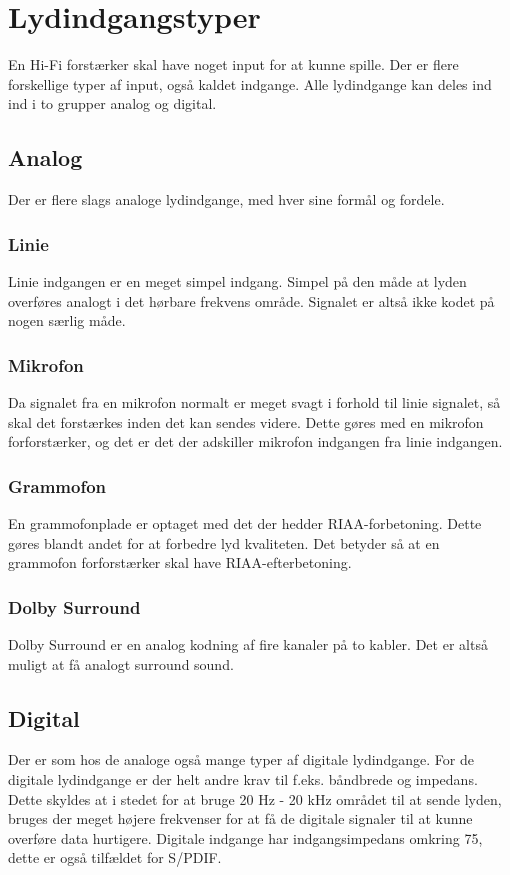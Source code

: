 \section{Lydindgangstyper}
\label{indgange}
En Hi-Fi forstærker skal have noget input for at kunne spille. Der er flere forskellige typer af input, også kaldet indgange. Alle lydindgange kan deles ind ind i to grupper analog og digital.

\subsection{Analog}
Der er flere slags analoge lydindgange, med hver sine formål og fordele.

\subsubsection{Linie}
Linie indgangen er en meget simpel indgang. Simpel på den måde at lyden overføres analogt i det hørbare frekvens område. Signalet er altså ikke kodet på nogen særlig måde. 

\subsubsection{Mikrofon}
Da signalet fra en mikrofon normalt er meget svagt i forhold til linie signalet, så skal det forstærkes inden det kan sendes videre. Dette gøres med en mikrofon forforstærker, og det er det der adskiller mikrofon indgangen fra linie indgangen. 

\subsubsection{Grammofon}
En grammofonplade er optaget med det der hedder RIAA-forbetoning. Dette gøres blandt andet for at forbedre lyd kvaliteten. Det betyder så at en grammofon forforstærker skal have RIAA-efterbetoning. 

\subsubsection{Dolby Surround}
Dolby Surround er en analog kodning af fire kanaler på to kabler. Det er altså muligt at få analogt surround sound.

\subsection{Digital}
Der er som hos de analoge også mange typer af digitale lydindgange. For de digitale lydindgange er der helt andre krav til f.eks. båndbrede og impedans. Dette skyldes at i stedet for at bruge 20 Hz - 20 kHz området til at sende lyden, bruges der meget højere frekvenser for at få de digitale signaler til at kunne overføre data hurtigere. Digitale indgange har indgangsimpedans omkring 75\ohm,  dette er også tilfældet for S/PDIF.

